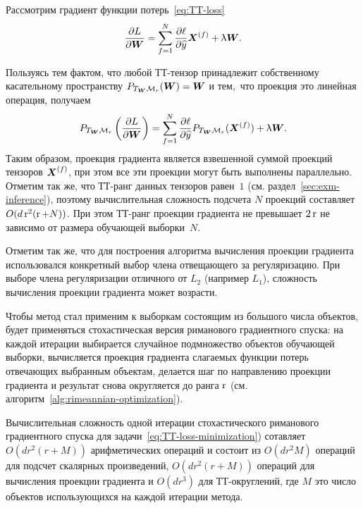Рассмотрим градиент функции потерь~\eqref{eq:TT-loss}
\begin{equation}
\label{eq:TT-gradient}
\frac{\partial L}{\partial \boldsymbol{W}} = \sum_{f=1}^N \frac{\partial \ell}{\partial \widehat{y}} \boldsymbol{X}^{(f)} + \uplambda \boldsymbol{W}.
\end{equation}

Пользуясь тем фактом, что любой ТТ-тензор принадлежит собственному касательному пространству $P_{T_{\boldsymbol{W}} \mathcal{M}_r}(\boldsymbol{W}) = \boldsymbol{W}$ и тем, что проекция это линейная операция, получаем
\begin{equation}
\label{eq:riemannian-gradient}
P_{T_{\boldsymbol{W}} \mathcal{M}_r}\left ( \frac{\partial L}{\partial \boldsymbol{W}} \right) = \sum_{f=1}^N \frac{\partial \ell}{\partial \widehat{y}} P_{T_{\boldsymbol{W}} \mathcal{M}_r}(\boldsymbol{X}^{(f)}) + \uplambda \boldsymbol{W}.
\end{equation}
Таким образом, проекция градиента является взвешенной суммой проекций тензоров $\boldsymbol{X}^{(f)}$, при этом все эти проекции могут быть выполнены параллельно.
Отметим так же, что ТТ-ранг данных тензоров равен~$1$ (см. раздел~\ref{sec:exm-inference}), поэтому вычислительная сложность подсчета $N$ проекций составляет $O(d \operatorname{r}^2 (\operatorname{r} + N))$.
При этом ТТ-ранг проекции градиента  не превышает $2 \operatorname{r}$ не зависимо от размера обучающей выборки~$N$.

Отметим так же, что для построения алгоритма вычисления проекции градиента использовался конкретный выбор члена отвещающего за регуляризацию. При выборе члена регуляризации отличного от  $L_2$ (например $L_1$), сложность вычисления проекции градиента может возрасти.

Чтобы метод стал применим к выборкам состоящим из большого числа объектов, будет применяться стохастическая версия риманового градиентного спуска: на каждой итерации выбирается случайное подмножество объектов обучающей выборки, вычисляется проекция градиента слагаемых функции потерь отвечающих выбранным объектам, делается шаг по направлению проекции градиента и результат снова округляется до ранга $\operatorname{r}$ (см. алгоритм~\ref{alg:rimeannian-optimization}).

Вычислительная сложность одной итерации стохастического риманового градиентного спуска для задачи~\eqref{eq:TT-loss-minimization}) сотавляет $O(dr^2(r + M))$ арифметических операций и состоит из $O(dr^2M)$ операций для подсчет скалярных произведений,  $O(dr^2(r + M))$ операций для вычисления проекции градиента и $O(dr^3)$ для ТТ-округлений, где $M$ это число объектов использующихся на каждой итерации метода.


